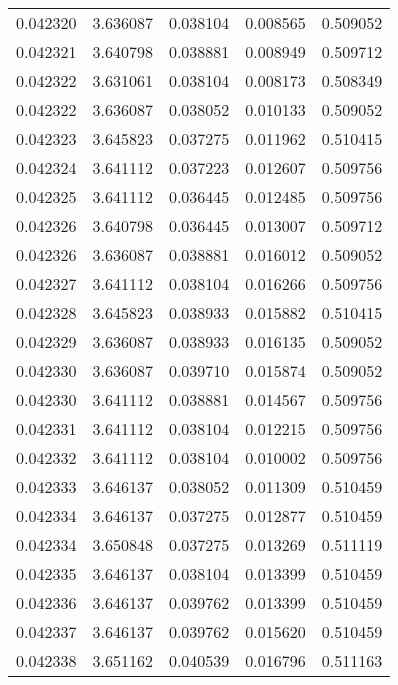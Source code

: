 \begin{tabular}{lrrrr}
0.042320    &  3.636087 &  0.038104 &  0.008565 &             0.509052 \\
0.042321    &  3.640798 &  0.038881 &  0.008949 &             0.509712 \\
0.042322    &  3.631061 &  0.038104 &  0.008173 &             0.508349 \\
0.042322    &  3.636087 &  0.038052 &  0.010133 &             0.509052 \\
0.042323    &  3.645823 &  0.037275 &  0.011962 &             0.510415 \\
0.042324    &  3.641112 &  0.037223 &  0.012607 &             0.509756 \\
0.042325    &  3.641112 &  0.036445 &  0.012485 &             0.509756 \\
0.042326    &  3.640798 &  0.036445 &  0.013007 &             0.509712 \\
0.042326    &  3.636087 &  0.038881 &  0.016012 &             0.509052 \\
0.042327    &  3.641112 &  0.038104 &  0.016266 &             0.509756 \\
0.042328    &  3.645823 &  0.038933 &  0.015882 &             0.510415 \\
0.042329    &  3.636087 &  0.038933 &  0.016135 &             0.509052 \\
0.042330    &  3.636087 &  0.039710 &  0.015874 &             0.509052 \\
0.042330    &  3.641112 &  0.038881 &  0.014567 &             0.509756 \\
0.042331    &  3.641112 &  0.038104 &  0.012215 &             0.509756 \\
0.042332    &  3.641112 &  0.038104 &  0.010002 &             0.509756 \\
0.042333    &  3.646137 &  0.038052 &  0.011309 &             0.510459 \\
0.042334    &  3.646137 &  0.037275 &  0.012877 &             0.510459 \\
0.042334    &  3.650848 &  0.037275 &  0.013269 &             0.511119 \\
0.042335    &  3.646137 &  0.038104 &  0.013399 &             0.510459 \\
0.042336    &  3.646137 &  0.039762 &  0.013399 &             0.510459 \\
0.042337    &  3.646137 &  0.039762 &  0.015620 &             0.510459 \\
0.042338    &  3.651162 &  0.040539 &  0.016796 &             0.511163 \\

\end{tabular}

